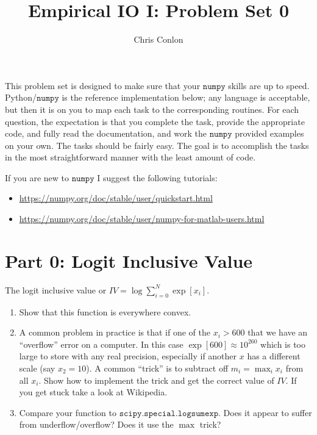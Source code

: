 \documentclass{article}
\begin{document}
\title{Empirical IO I: Problem Set 0} 
\author{Chris Conlon}
\date{}
\maketitle
This problem set is designed to make sure that your $\mathtt{numpy}$ skills are up to speed. Python/$\mathtt{numpy}$ is the reference implementation below; any language is acceptable, but then it is on you to map each task to the corresponding routines. For each question, the expectation is that you complete the task, provide the appropriate code, and fully read the documentation, and work the $\mathtt{numpy}$ provided examples on your own.  The tasks should be fairly easy.  The goal is to accomplish the tasks in the most straightforward manner with the least amount of code.  

If you are new to $\mathtt{numpy}$ I suggest the following tutorials:
\begin{itemize}
\item \url{https://numpy.org/doc/stable/user/quickstart.html}
\item  \url{https://numpy.org/doc/stable/user/numpy-for-matlab-users.html}
\end{itemize}

\section*{Part 0: Logit Inclusive Value}
The logit inclusive value or $IV = \log \sum_{i=0}^N \exp[x_i]$.
\begin{enumerate}
\item Show that this function is everywhere convex.
\item A common problem in practice is that if one of the $x_i > 600$ that we have an ``overflow'' error on a computer. In this case $\exp[600] \approx 10^{260}$ which is too large to store with any real precision, especially if another $x$ has a different scale (say $x_2=10$). A common ``trick'' is to subtract off $m_i = \max_i x_i$ from all $x_i$.  Show how to implement the trick and get the correct value of $IV$. If you get stuck take a look at Wikipedia.
\item Compare your function to $\mathtt{scipy.special.logsumexp}$. Does it appear to suffer from underflow/overflow? Does it use the $\max$ trick?
\end{enumerate}
\end{document}
